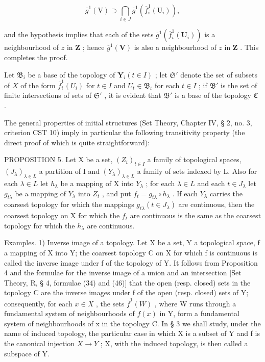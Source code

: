 \[
\overline {{g}} ^ {1} (\mathrm{V}) \supset \bigcap_ {i \in J} \overline {{g}} ^ {1} (\overline {{f}} _ {i} ^ {1} (\mathrm{U} _ {i})),
\]

and the hypothesis implies that each of the sets \(\overline{g}^{1}(\overline{f}_{i}^{1}(\mathbf{U}_{i}))\) is a neighbourhood of \(z\) in \(\mathbf{Z}\) ; hence \(\overline{g}^{1}(\mathbf{V})\) is also a neighbourhood of \(z\) in \(\mathbf{Z}\) . This completes the proof.

Let \(\mathfrak{B}_i\) be a base of the topology of \(\mathbf{Y}_i(t\in I)\) ; let \(\mathfrak{S}'\) denote the set of subsets of \(X\) of the form \(\overline{f}_i^1 (U_i)\) for \(t\in I\) and \(U_{t}\in \mathfrak{B}_{t}\) for each \(t\in I\) ; if \(\mathfrak{B}'\) is the set of finite intersections of sets of \(\mathfrak{S}'\) , it is evident that \(\mathfrak{B}'\) is a base of the topology \(\mathfrak{C}\) .

The general properties of initial structures (Set Theory, Chapter IV, § 2, no. 3, criterion CST 10) imply in particular the following transitivity property (the direct proof of which is quite straightforward):

PROPOSITION 5. Let X be a set, \((Z_{t})_{t\in I}\) a family of topological spaces, \((J_{\lambda})_{\lambda\in L}\) a partition of I and \((Y_{\lambda})_{\lambda\in L}\) a family of sets indexed by L. Also for each \(\lambda\in L\) let \(h_{\lambda}\) be a mapping of X into \(Y_{\lambda}\) ; for each \(\lambda\in L\) and each \(t\in J_{\lambda}\) let \(g_{t\lambda}\) be a mapping of \(Y_{\lambda}\) into \(Z_{t}\) , and put \(f_{t}=g_{t\lambda}\circ h_{\lambda}\) . If each \(Y_{\lambda}\) carries the coarsest topology for which the mappings \(g_{t\lambda}(t\in J_{\lambda})\) are continuous, then the coarsest topology on X for which the \(f_{t}\) are continuous is the same as the coarsest topology for which the \(h_{\lambda}\) are continuous.

Examples. 1) Inverse image of a topology. Let X be a set, Y a topological space, f a mapping of X into Y; the coarsest topology C on X for which f is continuous is called the inverse image under f of the topology of Y. It follows from Proposition 4 and the formulae for the inverse image of a union and an intersection {[}Set Theory, R, § 4, formulae (34) and (46){]} that the open (resp. closed) sets in the topology C are the inverse images under f of the open (resp. closed) sets of Y; consequently, for each \(x \in X\) , the sets \(\overline{f}^{1}(W)\) , where W runs through a fundamental system of neighbourhoods of \(f(x)\) in Y, form a fundamental system of neighbourhoods of x in the topology C. In § 3 we shall study, under the name of induced topology, the particular case in which X is a subset of Y and f is the canonical injection \(X \to Y\) ; X, with the induced topology, is then called a subspace of Y.

